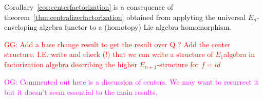 \documentclass[11pt]{amsart}
\numberwithin{equation}{section}
\def\owen{\textcolor{magenta}{OG: }\textcolor{magenta}}
\def\greg{\textcolor{red}{GG: }\textcolor{red}}
\begin{document}
\smallskip 

Corollary~\ref{cor:centerfactorization}  is a consequence of theorem~\ref{thm:centralizerfactorization} obtained from applyting the universal 
$E_n$-enveloping algebra functor to a (homotopy) Lie algebra homomorphism.

\greg{Add a base change result to get the result over Q ? Add the center structure. I.E. write and check (!) that we can write a structure of $E_1$algebra in factorization algebra describing the higher $E_{n+1}$-structure for $f=id$} 

\owen{Commented out here is a discussion of centers. We may want to resurrect it but it doesn't seem essential to the main results.}

%
% 
\end{document}
